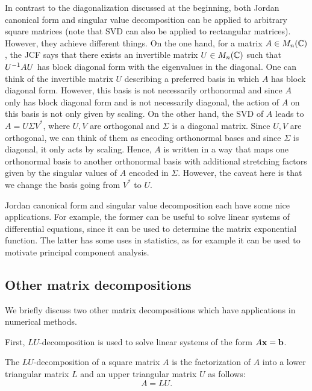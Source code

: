 \documentclass{article}
\begin{document}
In contrast to the diagonalization discussed at the beginning, both Jordan canonical form and singular value decomposition can be applied to arbitrary square matrices (note that SVD can also be applied to rectangular matrices). However, they achieve different things. On the one hand, for a matrix $A\in M_n({\mathbb{C}})$, the JCF says that there exists an invertible matrix $U\in M_n({\mathbb{C}})$ such that $U^{-1} A U$ has block diagonal form with the eigenvalues in the diagonal. One can think of the invertible matrix $U$ describing a preferred basis in which $A$ has block diagonal form. However, this basis is not necessarily orthonormal and since $A$ only has block diagonal form and is not necessarily diagonal, the action of $A $ on this basis is not only given by scaling. On the other hand, the SVD of $A$ leads to $A = U\Sigma V^* $, where $U,V$ are orthogonal and $\Sigma$ is a diagonal matrix. Since $U,V$ are orthogonal, we can think of them as encoding orthonormal bases and since $\Sigma$ is diagonal, it only acts by scaling. Hence, $A$ is written in a way that maps one orthonormal basis to another orthonormal basis with additional stretching factors given by the singular values of $A$ encoded in $\Sigma$.  However, the caveat here is that we change the basis going from $V^*$ to $U$.

Jordan canonical form and singular value decomposition each have some nice applications. For example, the former can be useful to solve linear systems of differential equations, since it can be used to determine the matrix exponential function. The latter has some uses in statistics, as for example it can be used to motivate principal component analysis. 



\subsection{Other matrix decompositions}
We briefly discuss two other matrix decompositions which have applications in numerical methods.

First, $LU$-decomposition is used to solve linear systems of the form $A {\mathbf{x}} = \mathbf{b}$. 
\begin{definition}[$LU$-decomposition]
The $LU$-decomposition of a square matrix $A$ is the factorization of $A$ into a lower triangular matrix $L$ and an upper triangular matrix $U$ as follows:
\begin{equation*}
    A = LU.
\end{equation*}
\end{definition}
\end{document}
